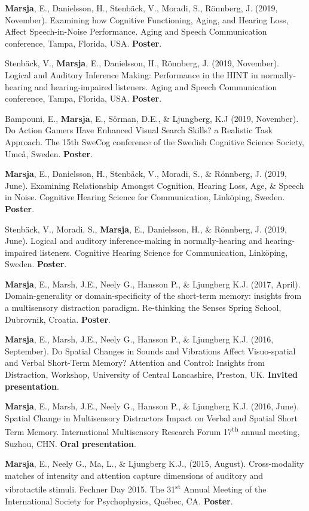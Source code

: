 \documentclass[]{article}
\begin{document}
\textbf{Marsja}, E., Danielsson, H., Stenbäck, V., Moradi, S., Rönnberg,
J. (2019, November). Examining how Cognitive Functioning, Aging, and
Hearing Loss, Affect Speech-in-Noise Performance. Aging and Speech
Communication conference, Tampa, Florida, USA. \textbf{Poster}.

Stenbäck, V., \textbf{Marsja}, E., Danielsson, H., Rönnberg, J. (2019,
November). Logical and Auditory Inference Making: Performance in the
HINT in normally-hearing and hearing-impaired listeners. Aging and
Speech Communication conference, Tampa, Florida, USA. \textbf{Poster}.

Bampouni, E., \textbf{Marsja}, E., Sörman, D.E., \& Ljungberg, K.J
(2019, November). Do Action Gamers Have Enhanced Visual Search Skills? a
Realistic Task Approach. The 15th SweCog conference of the Swedish
Cognitive Science Society, Umeå, Sweden. \textbf{Poster}.

\textbf{Marsja}, E., Danielsson, H., Stenbäck, V., Moradi, S., \&
Rönnberg, J. (2019, June). Examining Relationship Amongst Cognition,
Hearing Loss, Age, \& Speech in Noise. Cognitive Hearing Science for
Communication, Linköping, Sweden. \textbf{Poster}.

Stenbäck, V., Moradi, S., \textbf{Marsja}, E., Danielsson, H., \&
Rönnberg, J. (2019, June). Logical and auditory inference-making in
normally-hearing and hearing-impaired listeners. Cognitive Hearing
Science for Communication, Linköping, Sweden. \textbf{Poster}.

\textbf{Marsja}, E., Marsh, J.E., Neely G., Hansson P., \& Ljungberg
K.J. (2017, April). Domain-generality or domain-specificity of the
short-term memory: insights from a multisensory distraction paradigm.
Re-thinking the Senses Spring School, Dubrovnik, Croatia.
\textbf{Poster}.

\textbf{Marsja}, E., Marsh, J.E., Neely G., Hansson P., \& Ljungberg
K.J. (2016, September). Do Spatial Changes in Sounds and Vibrations
Affect Visuo-spatial and Verbal Short-Term Memory? Attention and
Control: Insights from Distraction, Workshop, University of Central
Lancashire, Preston, UK. \textbf{Invited presentation}.

\textbf{Marsja}, E., Marsh, J.E., Neely G., Hansson P., \& Ljungberg
K.J. (2016, June). Spatial Change in Multisensory Distractors Impact on
Verbal and Spatial Short Term Memory. International Multisensory
Research Forum 17\textsuperscript{th} annual meeting, Suzhou, CHN.
\textbf{Oral presentation}.

\textbf{Marsja}, E., Neely G., Ma, L., \& Ljungberg K.J., (2015,
August). Cross-modality matches of intensity and attention capture
dimensions of auditory and vibrotactile stimuli. Fechner Day 2015. The
31\textsuperscript{st} Annual Meeting of the International Society for
Psychophysics, Québec, CA. \textbf{Poster}.
\end{document}
